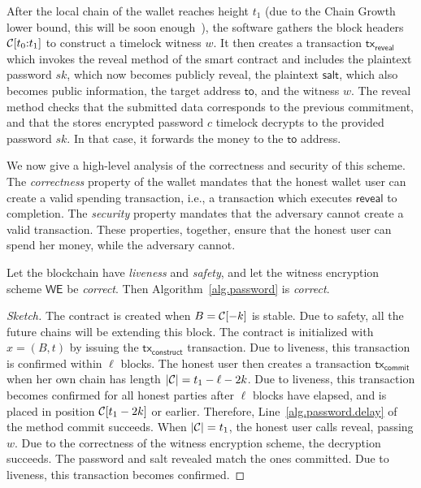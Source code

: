 After the local chain of the wallet reaches height $t_1$ (due to the Chain Growth lower bound, this
will be soon enough~\cite{backbone}), the software gathers the block headers
$\mathcal{C}[t_0{:}t_1]$ to construct a timelock witness $w$. It then creates a transaction
$\textsf{tx}_\textsf{reveal}$ which invokes the \textsf{reveal} method of the smart contract
and includes the plaintext password $sk$, which now becomes publicly reveal, the plaintext
$\textsf{salt}$, which also becomes public information, the target address $\textsf{to}$, and
the witness $w$. The \textsf{reveal} method checks that the submitted data corresponds to the
previous commitment, and that the stores encrypted password $c$ timelock decrypts to the provided
password $sk$. In that case, it forwards the money to the $\textsf{to}$ address.

We now give a high-level analysis of the correctness and security of this scheme.
The \emph{correctness} property of the wallet mandates that the honest wallet user can
create a valid spending transaction, i.e., a transaction which executes
$\textsf{reveal}$ to completion. The \emph{security} property mandates that the adversary
cannot create a valid transaction. These properties, together, ensure that the honest user
can spend her money, while the adversary cannot.

\begin{theorem}
  Let the blockchain have \emph{liveness} and \emph{safety},
  and let the witness encryption scheme $\textsf{WE}$ be \emph{correct}.
  Then Algorithm~\ref{alg.password} is \emph{correct}.
\end{theorem}
\begin{proof}[Sketch]
  The contract is created when $B = \mathcal{C}[-k]$ is stable. Due to safety, all the future chains
  will be extending this block. The contract is initialized with $x = (B, t)$ by issuing the
  $\textsf{tx}_\textsf{construct}$ transaction. Due to liveness, this transaction is confirmed
  within $\ell$ blocks.
  The honest user then creates a transaction $\textsf{tx}_\textsf{commit}$ when her
  own chain has length $|\mathcal{C}| = t_1 - \ell - 2k$.
  Due to liveness, this transaction becomes confirmed for all honest parties after $\ell$ blocks
  have elapsed, and is placed in position $\mathcal{C}[t_1 - 2k]$ or earlier. Therefore, Line~\ref{alg.password.delay}
  of the method \textsf{commit} succeeds. When $|\mathcal{C}| = t_1$, the honest user calls
  \textsf{reveal}, passing $w$. Due to the correctness of the witness encryption scheme,
  the decryption succeeds. The password and salt revealed match the ones committed.
  Due to liveness, this transaction becomes confirmed.
\end{proof}

